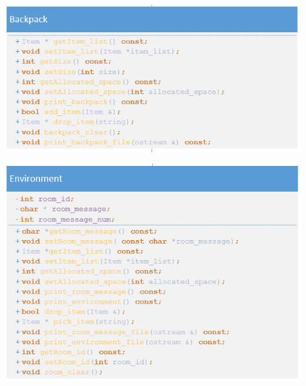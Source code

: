 \begin{center}
			\includegraphics[width=1\textwidth]{image/1.5.2.PNG}		
\end{center}

\begin{center}
			\includegraphics[width=1\textwidth]{image/1.5.3.PNG}		
\end{center}

